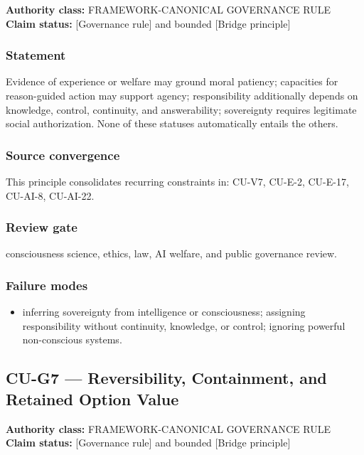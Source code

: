 \documentclass[
  11pt,
]{article}
\providecommand{\tightlist}{%
  \setlength{\itemsep}{0pt}\setlength{\parskip}{0pt}}
\begin{document}
\textbf{Authority class:} FRAMEWORK-CANONICAL GOVERNANCE RULE\\
\textbf{Claim status:} {[}Governance rule{]} and bounded {[}Bridge
principle{]}

\subsubsection{Statement}\label{statement-56}

Evidence of experience or welfare may ground moral patiency; capacities
for reason-guided action may support agency; responsibility additionally
depends on knowledge, control, continuity, and answerability;
sovereignty requires legitimate social authorization. None of these
statuses automatically entails the others.

\subsubsection{Source convergence}\label{source-convergence-5}

This principle consolidates recurring constraints in: CU-V7, CU-E-2,
CU-E-17, CU-AI-8, CU-AI-22.

\subsubsection{Review gate}\label{review-gate-12}

consciousness science, ethics, law, AI welfare, and public governance
review.

\subsubsection{Failure modes}\label{failure-modes-29}

\begin{itemize}
\tightlist
\item
  inferring sovereignty from intelligence or consciousness; assigning
  responsibility without continuity, knowledge, or control; ignoring
  powerful non-conscious systems.
\end{itemize}

\subsection{CU-G7 --- Reversibility, Containment, and Retained Option
Value}\label{cu-g7-reversibility-containment-and-retained-option-value}

\textbf{Authority class:} FRAMEWORK-CANONICAL GOVERNANCE RULE\\
\textbf{Claim status:} {[}Governance rule{]} and bounded {[}Bridge
principle{]}
\end{document}
